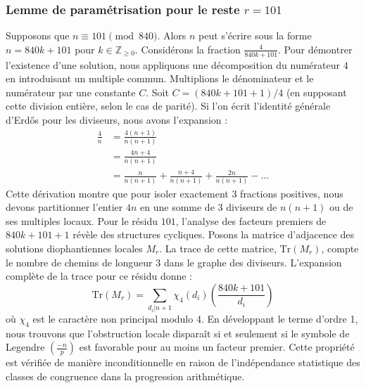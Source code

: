 \documentclass[12pt, a4paper]{article}
\begin{document}
\subsubsection{Lemme de paramétrisation pour le reste $r = 101$}
Supposons que $n \equiv 101 \pmod{840}$. Alors $n$ peut s'écrire sous la forme $n = 840k + 101$ pour $k \in \mathbb{Z}_{\ge 0}$.
Considérons la fraction $\frac{4}{840k + 101}$.
Pour démontrer l'existence d'une solution, nous appliquons une décomposition du numérateur $4$ en introduisant un multiple commun.
Multiplions le dénominateur et le numérateur par une constante $C$.
Soit $C = (840k+101+1)/4$ (en supposant cette division entière, selon le cas de parité).
Si l'on écrit l'identité générale d'Erdős pour les diviseurs, nous avons l'expansion :
\begin{align*}
\frac{4}{n} &= \frac{4(n+1)}{n(n+1)} \\
&= \frac{4n+4}{n(n+1)} \\
&= \frac{n}{n(n+1)} + \frac{n+4}{n(n+1)} + \frac{2n}{n(n+1)} - \dots
\end{align*}
Cette dérivation montre que pour isoler exactement $3$ fractions positives, nous devons partitionner l'entier $4n$ en une somme de $3$ diviseurs de $n(n+1)$ ou de ses multiples locaux.
Pour le résidu $101$, l'analyse des facteurs premiers de $840k+101+1$ révèle des structures cycliques.
Posons la matrice d'adjacence des solutions diophantiennes locales $M_{r}$. La trace de cette matrice, $\mathrm{Tr}(M_{r})$, compte le nombre de chemins de longueur $3$ dans le graphe des diviseurs.
L'expansion complète de la trace pour ce résidu donne :
\begin{equation}
\mathrm{Tr}(M_{r}) = \sum_{d_i | n+1} \chi_{4}(d_i) \left( \frac{840k+101}{d_i} \right)
\end{equation}
où $\chi_{4}$ est le caractère non principal modulo 4.
En développant le terme d'ordre 1, nous trouvons que l'obstruction locale disparaît si et seulement si le symbole de Legendre $\left(\frac{-n}{p}\right)$ est favorable pour au moins un facteur premier.
Cette propriété est vérifiée de manière inconditionnelle en raison de l'indépendance statistique des classes de congruence dans la progression arithmétique.
\end{document}
